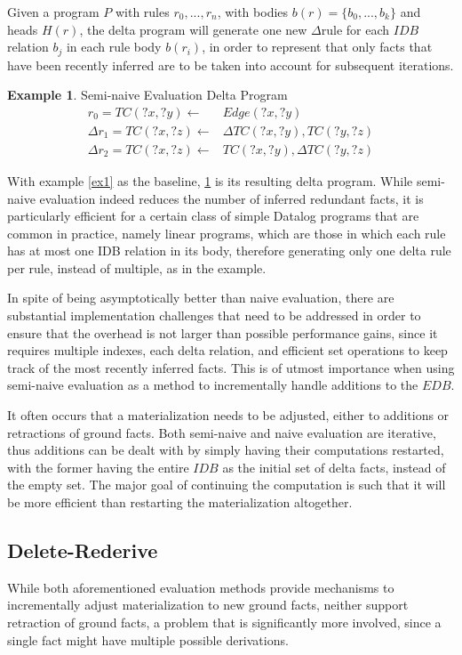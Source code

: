 \documentclass[sigconf,screen,review=false,natbib]{acmart}
\theoremstyle{definition}
\newtheorem{exmp}{Example}[section]
\begin{document}
Given a program $P$ with rules $r_0, ..., r_n$, with bodies $b(r) = \{b_0, ..., b_k\}$ and heads $H(r)$, the delta program
will generate one new $\Delta$rule for each $IDB$ relation $b_j$ in each rule body $b(r_i)$, in order to represent that only
facts that have been recently inferred are to be taken into account for subsequent iterations.
\begin{exmp}{Semi-naive Evaluation Delta Program}
	\begin{align*}
		r_0 = TC(?x, ?y) \leftarrow        & Edge(?x, ?y)                  \\
		\Delta r_1 = TC(?x, ?z) \leftarrow & \Delta TC(?x, ?y), TC(?y, ?z) \\
		\Delta r_2 = TC(?x, ?z) \leftarrow & TC(?x, ?y), \Delta TC(?y, ?z)
	\end{align*}
	\label{exsne}
\end{exmp}
With example \ref{ex1} as the baseline, \ref{exsne} is its resulting delta program. While semi-naive evaluation indeed reduces
the number of inferred redundant facts, it is particularly efficient for a certain class of simple Datalog programs that are common
in practice, namely linear programs, which are those in which each rule has at most one IDB relation in its body, therefore
generating only one delta rule per rule, instead of multiple, as in the example.

In spite of being asymptotically better than naive evaluation, there are substantial implementation challenges that need to be
addressed in order to ensure that the overhead is not larger than possible performance gains, since it requires multiple
indexes, each delta relation, and efficient set operations to keep track of the most recently inferred facts. This is of utmost
importance when using semi-naive evaluation as a method to incrementally handle additions to the $EDB$.

It often occurs that a materialization needs to be adjusted, either to additions or retractions of ground facts. Both semi-naive
and naive evaluation are iterative, thus additions can be dealt with by simply having their computations restarted, with the former
having the entire $IDB$ as the initial set of delta facts, instead of the empty set. The major goal of continuing the computation is
such that it will be more efficient than restarting the materialization altogether.
\subsection{Delete-Rederive}
While both aforementioned evaluation methods provide mechanisms to incrementally adjust materialization to new ground facts, neither
support retraction of ground facts, a problem that is significantly more involved, since a single fact might have multiple possible
derivations.
\end{document}
